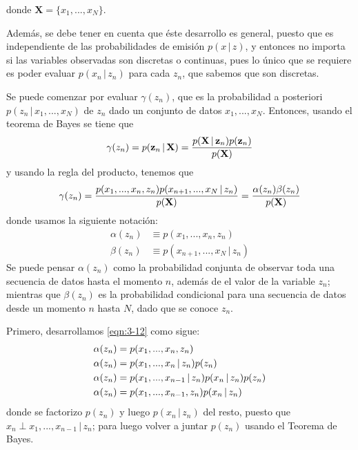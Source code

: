 donde $\mathbf{X} = \lbrace x_1, ..., x_N \rbrace$. 

Además, se debe tener en cuenta que éste desarrollo es general, puesto que es independiente de las probabilidades de emisión $p(x \,|\, z)$, y entonces no importa si las variables observadas son discretas o continuas, pues lo único que se requiere es poder evaluar $p(x_n \,|\, z_n)$ para cada $z_n$, que sabemos que son discretas.

Se puede comenzar por evaluar $\gamma(z_n)$, que es la probabilidad a posteriori $p(z_n \,|\, x_1, ..., x_N)$ de $z_n$ dado un conjunto de datos $x_1, ..., x_N$. Entonces, usando el teorema de Bayes se tiene que
\begin{equation}
  \gamma(z_n) = p(\textbf{z}_n \,|\, \textbf{X}) = 
    \frac{p(\textbf{X} \,|\, \textbf{z}_n) p(\textbf{z}_n)}{p(\textbf{X})} 
  \label{eqn:3-10}
\end{equation}
y usando la regla del producto, tenemos que
\begin{equation}
  \gamma(z_n) = \frac{
    p(x_1, ..., x_n, z_n) p(x_{n+1}, ..., x_N \,|\, z_n)}
    {p(\textbf{X})} = \frac{\alpha(z_n) \beta(z_n)}{p(\textbf{X})}
  \label{eqn:3-11}
\end{equation}
donde usamos la siguiente notación:
\begin{align}
  \alpha(z_n) &\equiv p(x_1, ..., x_n, z_n) 
\label{eqn:3-12} \\
  \beta(z_n) &\equiv p(x_{n+1}, ..., x_N \,|\, z_n) 
  \label{eqn:3-13}
\end{align}
Se puede pensar $\alpha(z_n)$ como la probabilidad conjunta de observar toda una secuencia de datos hasta el momento $n$, además de el valor de la variable $z_n$; mientras que $\beta(z_n)$ es la probabilidad condicional para una secuencia de datos desde un momento $n$ hasta $N$, dado que se conoce $z_n$. 

Primero, desarrollamos \eqref{eqn:3-12} como sigue:
\begin{align}
  \alpha(z_n) &= p(x_1, ..., x_n, z_n)  
  \notag \\ 
  \alpha(z_n) &= p(x_1, ..., x_n \,|\, z_n)  p(z_n) 
  \notag \\ 
  \alpha(z_n) &= p(x_1, ..., x_{n-1} \,|\, z_n) p(x_n \,|\, z_n)  p(z_n) 
  \notag \\ 
  \alpha(z_n) &= p(x_1, ..., x_{n-1}, z_n) p(x_n \,|\, z_n)
  \notag
\end{align}
donde se factorizo $p(z_n)$ y luego $p(x_n \,|\, z_n)$ del resto, puesto que $x_n \perp x_1, ... , x_{n-1} \,|\, z_n$; para luego volver a juntar $p(z_n)$
usando el Teorema de Bayes.

